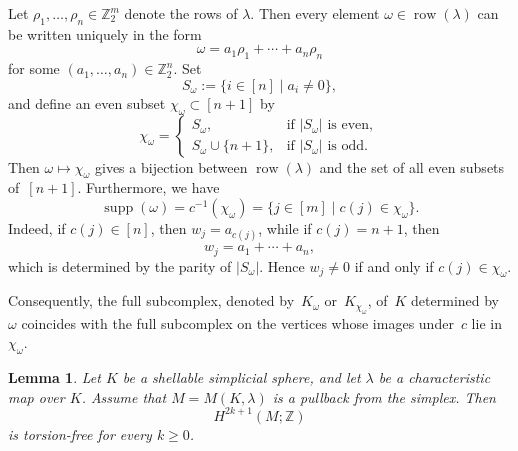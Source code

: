 \documentclass{amsart}
\newcommand{\Z}{\mathbb{Z}}
\newcommand{\supp}{\operatorname{supp}}
\DeclareMathOperator{\row}{row}
\theoremstyle{plain}
\newtheorem{lemma}[theorem]{Lemma}
\numberwithin{equation}{section}
\theoremstyle{definition}
\theoremstyle{remark}
\begin{document}
Let $\rho_1,\dots,\rho_n\in \Z_2^m$ denote the rows of $\lambda$.
Then every element $\omega \in \row(\lambda)$ can be written uniquely in the form
$$
    \omega=a_1\rho_1+\cdots+a_n\rho_n
$$
for some $(a_1,\dots,a_n)\in \Z_2^n$.
Set
$$
    S_\omega:=\{ i\in [n] \mid a_i\neq 0 \},
$$
and define an even subset $\chi_\omega\subset [n+1]$ by
$$
    \chi_\omega=
        \begin{cases}
            S_\omega, & \text{if } |S_\omega| \text{ is even},\\
            S_\omega\cup\{n+1\}, & \text{if } |S_\omega| \text{ is odd}.
        \end{cases}
$$
Then $\omega\mapsto \chi_\omega$ gives a bijection between $\row(\lambda)$ and the set of all even subsets of~$[n+1]$.
Furthermore, we have
$$
    \supp(\omega)= c^{-1}(\chi_\omega) = \{j\in [m]\mid c(j)\in \chi_\omega\}.
$$
Indeed, if $c(j)\in [n]$, then $w_j=a_{c(j)}$, while if $c(j)=n+1$, then
$$
    w_j=a_1+\cdots+a_n,
$$
which is determined by the parity of $|S_\omega|$. Hence $w_j\neq 0$ if and only if $c(j)\in \chi_\omega$.

Consequently, the full subcomplex, denoted by~$K_\omega$ or~$K_{\chi_\omega}$, of~$K$ determined by~$\omega$ coincides with the full subcomplex on the vertices whose images under~$c$ lie in~$\chi_\omega$.

\begin{lemma}\label{lemma:odd-cohomology-torsion-free-simplex-pullback}
    Let $K$ be a shellable simplicial sphere, and let $\lambda$ be a characteristic map over $K$.
    Assume that $M=M(K,\lambda)$ is a pullback from the simplex.
    Then
    $$
        H^{2k+1}(M;\Z)
    $$
    is torsion-free for every $k\ge 0$.
\end{lemma}
\end{document}
